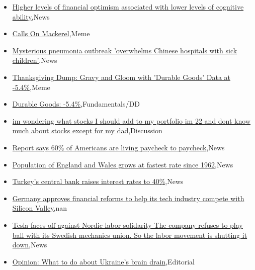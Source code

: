 \documentclass{article}%
\begin{document}
%
\begin{itemize}%
\item%
\href{https://reddit.com/r/wallstreetbets/comments/182mhag/higher\_levels\_of\_financial\_optimism\_associated/}{Higher levels of financial optimism associated with lower levels of cognitive ability},News%
\item%
\href{https://reddit.com/r/wallstreetbets/comments/182h0x7/calls\_on\_mackerel/}{Calls On Mackerel},Meme%
\item%
\href{https://reddit.com/r/wallstreetbets/comments/182gjug/mysterious\_pneumonia\_outbreak\_overwhelms\_chinese/}{Mysterious pneumonia outbreak 'overwhelms Chinese hospitals with sick children'},News%
\item%
\href{https://reddit.com/r/wallstreetbets/comments/182fp8z/thanksgiving\_dump\_gravy\_and\_gloom\_with\_durable/}{Thanksgiving Dump: Gravy and Gloom with 'Durable Goods' Data at -5.4\%},Meme%
\item%
\href{https://reddit.com/r/StockMarket/comments/182fsew/durable\_goods\_54/}{Durable Goods: -5.4\%},Fundamentals/DD%
\item%
\href{https://reddit.com/r/StockMarket/comments/182bxha/im\_wondering\_what\_stocks\_i\_should\_add\_to\_my/}{im wondering what stocks I should add to my portfolio im 22 and dont know much about stocks except for my dad},Discussion%
\item%
\href{https://reddit.com/r/Economics/comments/182mvkx/report\_says\_60\_of\_americans\_are\_living\_paycheck/}{Report says 60\% of Americans are living paycheck to paycheck},News%
\item%
\href{https://reddit.com/r/Economics/comments/182kz1z/population\_of\_england\_and\_wales\_grows\_at\_fastest/}{Population of England and Wales grows at fastest rate since 1962},News%
\item%
\href{https://reddit.com/r/Economics/comments/182ejdi/turkeys\_central\_bank\_raises\_interest\_rates\_to\_40/}{Turkey's central bank raises interest rates to 40\%},News%
\item%
\href{https://reddit.com/r/Economics/comments/1825tqi/germany\_approves\_financial\_reforms\_to\_help\_its/}{Germany approves financial reforms to help its tech industry compete with Silicon Valley},nan%
\item%
\href{https://reddit.com/r/Economics/comments/1822z6n/tesla\_faces\_off\_against\_nordic\_labor\_solidarity/}{Tesla faces off against Nordic labor solidarity  The company refuses to play ball with its Swedish mechanics union. So the labor movement is shutting it down},News%
\item%
\href{https://reddit.com/r/Economics/comments/1822305/opinion\_what\_to\_do\_about\_ukraines\_brain\_drain/}{Opinion: What to do about Ukraine's brain drain},Editorial%
\end{itemize}%
\end{document}
